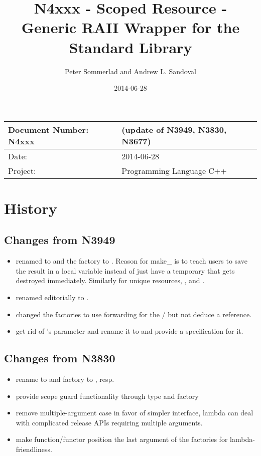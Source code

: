 \documentclass[ebook,11pt,article]{memoir}
\title{N4xxx - Scoped Resource - Generic RAII Wrapper for the Standard Library}
\author{Peter Sommerlad and Andrew L. Sandoval}
\date{2014-06-28}                                           %
\begin{document}
\maketitle
\begin{tabular}[t]{|l|l|}\hline 
Document Number: N4xxx &   (update of N3949, N3830, N3677)\\\hline
Date: & 2014-06-28 \\\hline
Project: & Programming Language C++\\\hline 
\end{tabular}

\chapter{History}
\section{Changes from N3949}
\begin{itemize}
\item renamed  to  and the factory to . Reason for make_ is to teach users to save the result in a local variable instead of just have a temporary that gets destroyed immediately. Similarly for unique resources, ,  and .
\item renamed editorially  to .
\item changed the factories to use forwarding for the / but not deduce a reference.
\item get rid of 's parameter and rename it to  and provide a  specification for it.
\end{itemize}


\section{Changes from N3830}
\begin{itemize}
\item rename to  and factory to , resp. 
\item provide scope guard functionality through type  and  factory
\item remove multiple-argument case in favor of simpler interface, lambda can deal with complicated release APIs requiring multiple arguments.
\item make function/functor position the last argument of the factories for lambda-friendliness.

\end{itemize}
\end{document}
